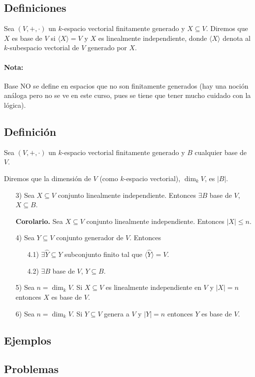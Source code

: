 \subsection*{Definiciones}
Sea \( (V, +, \cdot) \) un \( k \)-espacio vectorial finitamente generado y \( X \subseteq V \).
Diremos que \( X \) es base de \( V \) si \( \langle X \rangle = V \) y \( X \) es linealmente independiente, donde \( \langle X \rangle \) denota al \( k \)-subespacio vectorial de \( V \) generado por \( X \).

\paragraph{Nota:}
Base NO se define en espacios que no son finitamente generados (hay una noción análoga pero no se ve en este curso, pues se tiene que tener mucho cuidado con la lógica).

\subsection*{Definición}
Sea \( (V, +, \cdot) \) un \( k \)-espacio vectorial finitamente generado y \( B \) cualquier base de \( V \).

Diremos que la dimensión de \( V \) (como \( k \)-espacio vectorial), \( \dim_k V \), es \( |B| \).

\begin{enumerate}
    \item[3)] Sea \( X \subseteq V \) conjunto linealmente independiente. Entonces \( \exists B \) base de \( V \), \( X \subseteq B \).
    
    \item[\textbf{Corolario.}] Sea \( X \subseteq V \) conjunto linealmente independiente. Entonces \( |X| \leq n \).
    
    \item[4)] Sea \( Y \subseteq V \) conjunto generador de \( V \). Entonces
    \begin{enumerate}
        \item[4.1)] \( \exists \hat{Y} \subseteq Y \) subconjunto finito tal que \( \langle \hat{Y} \rangle = V \).
        \item[4.2)] \( \exists B \) base de \( V \), \( Y \subseteq B \).
    \end{enumerate}
    
    \item[5)] Sea \( n = \dim_k V \). Si \( X \subseteq V \) es linealmente independiente en \( V \) y \( |X| = n \) entonces \( X \) es base de \( V \).
    
    \item[6)] Sea \( n = \dim_k V \). Si \( Y \subseteq V \) genera a \( V \) y \( |Y| = n \) entonces \( Y \) es base de \( V \).
\end{enumerate}


\subsection*{Ejemplos}

\subsection*{Problemas}